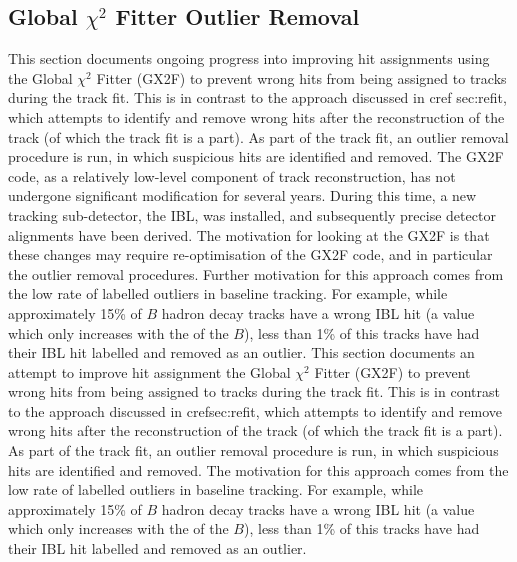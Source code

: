 \subsection{Global \texorpdfstring{$\chi^2$}{chi2} Fitter Outlier Removal}\label{sec:gx2f_opt}
This section documents ongoing progress into improving hit assignments using the Global $\chi^2$ Fitter (GX2F) to prevent wrong hits from being assigned to tracks during the track fit. This is in contrast to the approach discussed in  cref sec:refit, which attempts to identify and remove wrong hits after the reconstruction of the track (of which the track fit is a part). As part of the track fit, an outlier removal procedure is run, in which suspicious hits are identified and removed. The GX2F code, as a relatively low-level component of track reconstruction, has not undergone significant modification for several years. During this time, a new tracking sub-detector, the IBL, was installed, and subsequently precise detector alignments have been derived. The motivation for looking at the GX2F is that these changes may require re-optimisation of the GX2F code, and in particular the outlier removal procedures. Further motivation for this approach comes from the low rate of labelled outliers in baseline tracking. For example, while approximately 15\% of $B$ hadron decay tracks have a wrong IBL hit (a value which only increases with the \pT of the $B$), less than 1\% of this tracks have had their IBL hit labelled and removed as an outlier.
This section documents an attempt to improve hit assignment the Global $\chi^2$ Fitter (GX2F) to prevent wrong hits from being assigned to tracks during the track fit. This is in contrast to the approach discussed in cref{sec:refit}, which attempts to identify and remove wrong hits after the reconstruction of the track (of which the track fit is a part). As part of the track fit, an outlier removal procedure is run, in which suspicious hits are identified and removed. The motivation for this approach comes from the low rate of labelled outliers in baseline tracking. For example, while approximately 15\% of $B$ hadron decay tracks have a wrong IBL hit (a value which only increases with the \pt of the $B$), less than 1\% of this tracks have had their IBL hit labelled and removed as an outlier.

